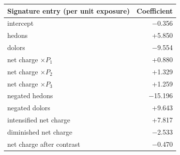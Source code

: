 \begin{tabular}{@{}lr@{}}
\toprule
Signature entry (per unit exposure) & Coefficient \\
\midrule
intercept & \ensuremath{-}0.356 \\
hedons & +5.850 \\
dolors & \ensuremath{-}9.554 \\
net charge $\times P_1$ & +0.880 \\
net charge $\times P_2$ & +1.329 \\
net charge $\times P_3$ & +1.259 \\
negated hedons & \ensuremath{-}15.196 \\
negated dolors & +9.643 \\
intensified net charge & +7.817 \\
diminished net charge & \ensuremath{-}2.533 \\
net charge after contrast & \ensuremath{-}0.470 \\
\bottomrule
\end{tabular}
